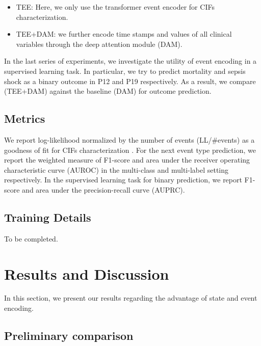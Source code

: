 \documentclass[journal,twoside,web]{ieeecolor}
\begin{document}
\begin{itemize}
    \item TEE: Here, we only use the transformer event encoder for CIFs characterization.
    \item TEE+DAM: we further encode time stamps and values of all clinical variables through the deep attention module (DAM).
\end{itemize}

In the last series of experiments, we investigate the utility of event encoding in a supervised learning task. In particular, we try to predict mortality and sepsis shock as a binary outcome in P12 and P19 respectively. As a result, we compare (TEE+DAM) against the baseline (DAM) for outcome prediction.



\subsection*{Metrics}
We report log-likelihood normalized by the number of events (LL/\#events) as a goodness of fit for CIFs characterization \cite*{zhangSelfAttentiveHawkesProcess2020,zuoTransformerHawkesProcess2020a}. For the next event type prediction, we report the weighted measure of F1-score and area under the receiver operating characteristic curve (AUROC) in the multi-class and multi-label setting respectively. In the supervised learning task for binary prediction, we report F1-score and area under the precision-recall curve (AUPRC).

\subsection*{Training Details}
To be completed.


\section{Results and Discussion}
\label{sec:Results and Discussion}


In this section, we present our results regarding the advantage of state and event encoding.

\subsection{Preliminary comparison}
\end{document}
